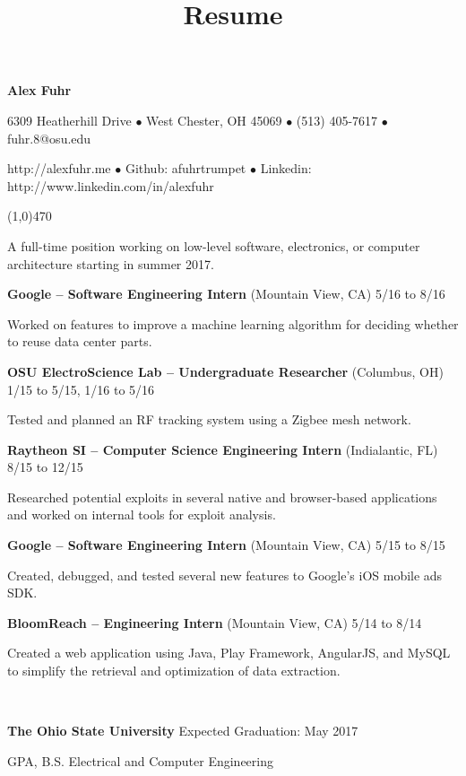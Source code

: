 \documentclass[10pt]{article}
\title{Resume}
\begin{document}
\centerline{{\LARGE \bf Alex Fuhr}}
\centerline{6309 Heatherhill Drive $\bullet$ West Chester, OH 45069 $\bullet$ (513) 405-7617 $\bullet$ fuhr.8@osu.edu}
\centerline{http://alexfuhr.me $\bullet$ Github: afuhrtrumpet $\bullet$ Linkedin: http://www.linkedin.com/in/alexfuhr}
\noindent
\line(1,0){470}\\

\smallskip

\noindent
A full-time position working on low-level software, electronics, or computer architecture starting in summer 2017.
\medskip

\smallskip

\centerline{{\large {\bf Google -- Software Engineering Intern} (Mountain View, CA) \hfill 5/16 to 8/16}}
\noindent
Worked on features to improve a machine learning algorithm for deciding whether to reuse data center parts.
\smallskip

\centerline{{\large {\bf OSU ElectroScience Lab -- Undergraduate Researcher} (Columbus, OH) \hfill 1/15 to 5/15, 1/16 to 5/16}}
\noindent
Tested and planned an RF tracking system using a Zigbee mesh network.
\smallskip

\centerline{{\large {\bf Raytheon SI -- Computer Science Engineering Intern} (Indialantic, FL) \hfill 8/15 to 12/15}}
\noindent
Researched potential exploits in several native and browser-based applications and worked on internal tools for exploit analysis.
\smallskip

\centerline{{\large {\bf Google -- Software Engineering Intern} (Mountain View, CA) \hfill 5/15 to 8/15}}
\noindent
Created, debugged, and tested several new features to Google's iOS mobile ads SDK.
\smallskip

\centerline{{\large {\bf BloomReach -- Engineering Intern} (Mountain View, CA) \hfill 5/14 to 8/14}}
\noindent
Created a web application using Java, Play Framework, AngularJS, and MySQL to simplify the retrieval and optimization of data extraction.
\smallskip

\\
\smallskip
\centerline{{\large {\bf The Ohio State University} \hfill Expected Graduation: May 2017}}
 GPA, B.S. Electrical and Computer Engineering
\medskip
\end{document}
